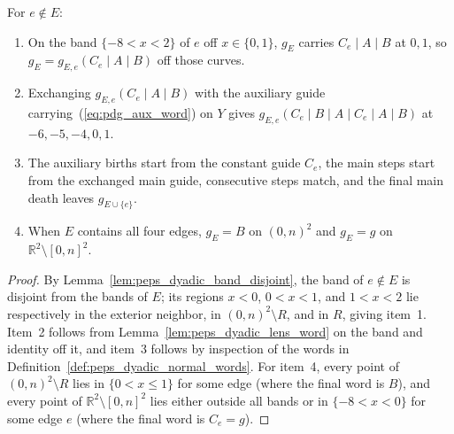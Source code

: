 \begin{lemma}
    \label{lem:peps_dyadic_schedule_guides}
    \leanok
    For $e\notin E$:
    \begin{enumerate}
        \item On the band $\{-8<x<2\}$ of $e$ off $x\in\{0,1\}$, $g_E$ carries
              $C_e\mid A\mid B$ at $0,1$, so $g_E=g_{E,e}(C_e\mid A\mid B)$ off
              those curves.
        \item Exchanging $g_{E,e}(C_e\mid A\mid B)$ with the auxiliary guide
              carrying~(\ref{eq:pdg_aux_word}) on $Y$ gives
              $g_{E,e}(C_e\mid B\mid A\mid C_e\mid A\mid B)$ at
              $-6,-5,-4,0,1$.
        \item The auxiliary births start from the constant guide $C_e$, the main
              steps start from the exchanged main guide, consecutive steps match,
              and the final main death leaves $g_{E\cup\{e\}}$.
        \item When $E$ contains all four edges, $g_E=B$ on $(0,n)^2$ and $g_E=g$
              on $\mathbb R^2\setminus[0,n]^2$.
    \end{enumerate}
\end{lemma}

\begin{proof}\leanok
    By Lemma~\ref{lem:peps_dyadic_band_disjoint}, the band of $e\notin E$ is
    disjoint from the bands of $E$; its regions $x<0$, $0<x<1$, and $1<x<2$ lie
    respectively in the exterior neighbor, in $(0,n)^2\setminus R$, and in $R$,
    giving item~1. Item~2 follows from Lemma~\ref{lem:peps_dyadic_lens_word} on
    the band and identity off it, and item~3 follows by inspection of the words in
    Definition~\ref{def:peps_dyadic_normal_words}. For item~4, every point of
    $(0,n)^2\setminus R$ lies in $\{0<x\le1\}$ for some edge (where the final word
    is $B$), and every point of $\mathbb R^2\setminus[0,n]^2$ lies either outside
    all bands or in $\{-8<x<0\}$ for some edge $e$ (where the final word is
    $C_e=g$).
\end{proof}


